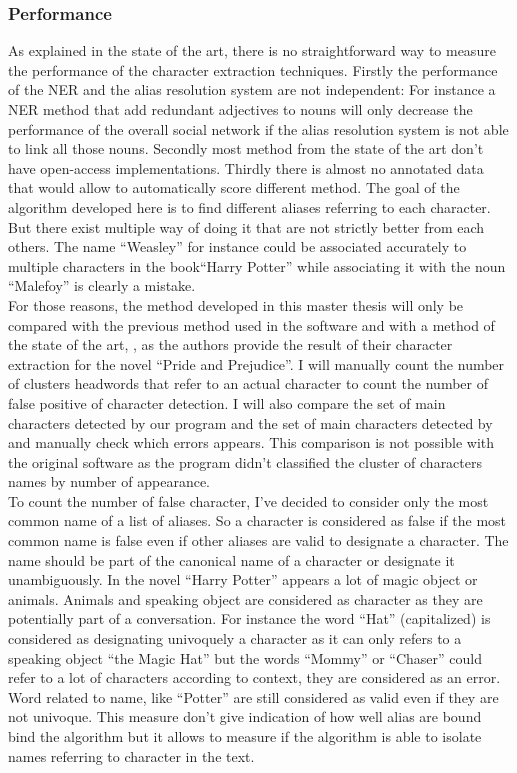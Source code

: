 \documentclass[a4paper, 12pt]{report}
\begin{document}
\subsubsection{Performance}
\label{performance}
As explained in the state of the art, there is no straightforward way to measure the performance of the character extraction techniques. Firstly the performance of the NER and the alias resolution system are not independent: For instance a NER method that add redundant adjectives to nouns will only decrease the performance of the overall social network if the alias resolution system is not able to link all those nouns. Secondly most method from the state of the art don't have open-access implementations. Thirdly there is almost no annotated data that would allow to automatically score different method. The goal of the algorithm developed here is to find different aliases referring to each character. But there exist multiple way of doing it that are not strictly better from each others. The name ``Weasley'' for instance could be associated accurately to multiple characters in the book``Harry Potter'' while associating it with the noun ``Malefoy'' is clearly a mistake.\\

For those reasons, the method developed in this master thesis will only be compared with the previous method used in the software \citep{original} and with a method of the state of the art, \cite{character_meta},  as the authors provide the result of their character extraction for the novel ``Pride and Prejudice''. I will manually count the number of clusters headwords that refer to an actual character to count the number of false positive of character detection. I will also compare the set of main characters detected by our program and the set of main characters detected by \cite{character_meta} and manually check which errors appears. This comparison is not possible with the original software as the program didn't classified the cluster of characters names by number of appearance.\\

To count the number of  false character, I've decided to consider only the most common name of a list of aliases. So a character is considered as false if the most common name is false even if other aliases are valid to designate a character. The name should be part of the canonical name of a character or designate it unambiguously. In the novel ``Harry Potter'' appears a lot of magic object or animals. Animals and speaking object are considered as character as they are potentially part of a conversation. For instance the word ``Hat'' (capitalized) is considered as designating univoquely a character as it can only refers to a speaking object ``the Magic Hat'' but the words ``Mommy'' or ``Chaser'' could refer to a lot of characters according to context, they are considered as an error. Word related to name, like ``Potter'' are still considered as valid even if they are not univoque. This measure don't give indication of how well alias are bound bind the algorithm but it allows to measure if the algorithm is able to isolate names referring to character in the text. \\
\end{document}
